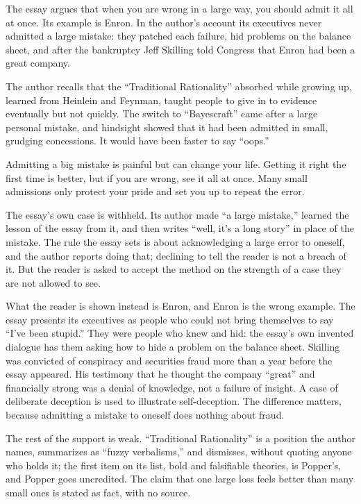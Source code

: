 \begin{afterword}
\summaryhead

The essay argues that when you are wrong in a large way, you should admit it all at once. Its example is Enron. In the author's account its executives never admitted a large mistake: they patched each failure, hid problems on the balance sheet, and after the bankruptcy Jeff Skilling told Congress that Enron had been a great company.

The author recalls that the ``Traditional Rationality'' absorbed while growing up, learned from Heinlein and Feynman, taught people to give in to evidence eventually but not quickly. The switch to ``Bayescraft'' came after a large personal mistake, and hindsight showed that it had been admitted in small, grudging concessions. It would have been faster to say ``oops.''

Admitting a big mistake is painful but can change your life. Getting it right the first time is better, but if you are wrong, see it all at once. Many small admissions only protect your pride and set you up to repeat the error.

\responsehead

The essay's own case is withheld. Its author made ``a large mistake,'' learned the lesson of the essay from it, and then writes ``well, it's a long story'' in place of the mistake. The rule the essay sets is about acknowledging a large error to oneself, and the author reports doing that; declining to tell the reader is not a breach of it. But the reader is asked to accept the method on the strength of a case they are not allowed to see.

What the reader is shown instead is Enron, and Enron is the wrong example. The essay presents its executives as people who could not bring themselves to say ``I've been stupid.'' They were people who knew and hid: the essay's own invented dialogue has them asking how to hide a problem on the balance sheet. Skilling was convicted of conspiracy and securities fraud more than a year before the essay appeared. His testimony that he thought the company ``great'' and financially strong was a denial of knowledge, not a failure of insight. A case of deliberate deception is used to illustrate self-deception. The difference matters, because admitting a mistake to oneself does nothing about fraud.

The rest of the support is weak. ``Traditional Rationality'' is a position the author names, summarizes as ``fuzzy verbalisms,'' and dismisses, without quoting anyone who holds it; the first item on its list, bold and falsifiable theories, is Popper's, and Popper goes uncredited. The claim that one large loss feels better than many small ones is stated as fact, with no source.


\end{afterword}
